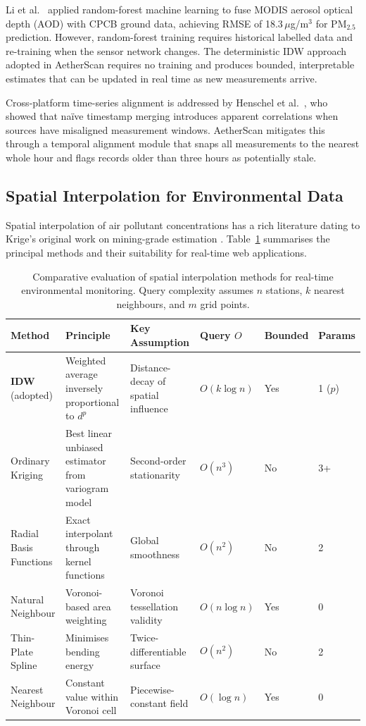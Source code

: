 \documentclass[12pt,a4paper]{article}
\begin{document}
Li et al.~\cite{li2020} applied random-forest machine learning to fuse MODIS
aerosol optical depth (AOD) with CPCB ground data, achieving RMSE of
18.3\,$\mu$g/m$^{3}$ for $\text{PM}_{2.5}$ prediction. However, random-forest
training requires historical labelled data and re-training when the sensor
network changes. The deterministic IDW approach adopted in AetherScan requires
no training and produces bounded, interpretable estimates that can be updated
in real time as new measurements arrive.

Cross-platform time-series alignment is addressed by Henschel et al.~\cite{henschel2018},
who showed that na\"ive timestamp merging introduces apparent correlations when
sources have misaligned measurement windows. AetherScan mitigates this through
a temporal alignment module that snaps all measurements to the nearest whole hour
and flags records older than three hours as potentially stale.

\subsection{Spatial Interpolation for Environmental Data}
\label{sec:litreview:interp}

Spatial interpolation of air pollutant concentrations has a rich literature
dating to Krige's original work on mining-grade estimation \cite{krige1951}.
Table~\ref{tab:interp_compare} summarises the principal methods and their
suitability for real-time web applications.

\begin{table}[H]
\centering
\caption[Comparative evaluation of spatial interpolation methods]{%
Comparative evaluation of spatial interpolation methods for real-time
environmental monitoring. Query complexity assumes $n$ stations,
$k$ nearest neighbours, and $m$ grid points.}
\label{tab:interp_compare}
\begin{tabularx}{\textwidth}{@{}lXXlll@{}}
\toprule
\textbf{Method} & \textbf{Principle} & \textbf{Key Assumption} &
\textbf{Query $O$} & \textbf{Bounded} & \textbf{Params} \\
\midrule
\textbf{IDW} (adopted) &
  Weighted average inversely proportional to $d^p$ &
  Distance-decay of spatial influence &
  $O(k\log n)$ & Yes & 1 ($p$) \\[4pt]
Ordinary Kriging &
  Best linear unbiased estimator from variogram model &
  Second-order stationarity &
  $O(n^3)$ & No & 3+ \\[4pt]
Radial Basis Functions &
  Exact interpolant through kernel functions &
  Global smoothness &
  $O(n^2)$ & No & 2 \\[4pt]
Natural Neighbour &
  Voronoi-based area weighting &
  Voronoi tessellation validity &
  $O(n\log n)$ & Yes & 0 \\[4pt]
Thin-Plate Spline &
  Minimises bending energy &
  Twice-differentiable surface &
  $O(n^2)$ & No & 2 \\[4pt]
Nearest Neighbour &
  Constant value within Voronoi cell &
  Piecewise-constant field &
  $O(\log n)$ & Yes & 0 \\
\bottomrule
\end{tabularx}
\end{table}
\end{document}
